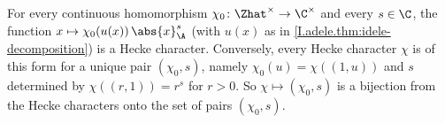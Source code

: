 For every continuous homomorphism $\chi_0\colon\Zhat^\times\to\C^\times$ and every $s\in\C$, the function
$x\mapsto\chi_0(u(x))\,\abs{x}_\A^{s}$ (with $u(x)$ as in \cref{I.adele.thm:idele-decomposition}) is a Hecke character.
Conversely, every Hecke character $\chi$ is of this form for a unique pair $(\chi_0,s)$, namely
$\chi_0(u)=\chi((1,u))$ and $s$ determined by $\chi((r,1))=r^s$ for $r>0$. So $\chi\mapsto(\chi_0,s)$ is a bijection from
the Hecke characters onto the set of pairs $(\chi_0,s)$.
